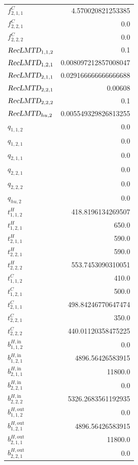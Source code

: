 \documentclass{article}%
\begin{document}
\begin{multicols*}{3}
\begin{supertabular}{lr}
	$f_{2,1,1}^{C}$ & 4.570020821253385 \\%
	$f_{2,2,1}^{C}$ & 0.0 \\%
	$f_{2,2,2}^{C}$ & 0.0 \\%
	$\textsl{RecLMTD}_{1,1,2}$ & 0.1 \\%
	$\textsl{RecLMTD}_{1,2,1}$ & 0.008097212857008047 \\%
	$\textsl{RecLMTD}_{2,1,1}$ & 0.029166666666666688 \\%
	$\textsl{RecLMTD}_{2,2,1}$ & 0.00608 \\%
	$\textsl{RecLMTD}_{2,2,2}$ & 0.1 \\%
	$\textsl{RecLMTD}_{hu,2}$ & 0.005549329826813255 \\%
	$q_{1,1,2}$ & 0.0 \\%
	$q_{1,2,1}$ & 0.0 \\%
	$q_{2,1,1}$ & 0.0 \\%
	$q_{2,2,1}$ & 0.0 \\%
	$q_{2,2,2}$ & 0.0 \\%
	$q_{hu,2}$ & 0.0 \\%
	$t_{1,1,2}^{H}$ & 418.8196134269507 \\%
	$t_{1,2,1}^{H}$ & 650.0 \\%
	$t_{2,1,1}^{H}$ & 590.0 \\%
	$t_{2,2,1}^{H}$ & 590.0 \\%
	$t_{2,2,2}^{H}$ & 553.7453090310051 \\%
	$t_{1,1,2}^{C}$ & 410.0 \\%
	$t_{1,2,1}^{C}$ & 500.0 \\%
	$t_{2,1,1}^{C}$ & 498.84246770647474 \\%
	$t_{2,2,1}^{C}$ & 350.0 \\%
	$t_{2,2,2}^{C}$ & 440.01120358475225 \\%
	$b_{1,1,2}^{H,\text{in}}$ & 0.0 \\%
	$b_{1,2,1}^{H,\text{in}}$ & 4896.56426583915 \\%
	$b_{2,1,1}^{H,\text{in}}$ & 11800.0 \\%
	$b_{2,2,1}^{H,\text{in}}$ & 0.0 \\%
	$b_{2,2,2}^{H,\text{in}}$ & 5326.2683561192935 \\%
	$b_{1,1,2}^{H,\text{out}}$ & 0.0 \\%
	$b_{1,2,1}^{H,\text{out}}$ & 4896.56426583915 \\%
	$b_{2,1,1}^{H,\text{out}}$ & 11800.0 \\%
	$b_{2,2,1}^{H,\text{out}}$ & 0.0 \\%

\end{supertabular}
\end{multicols*}
\end{document}
